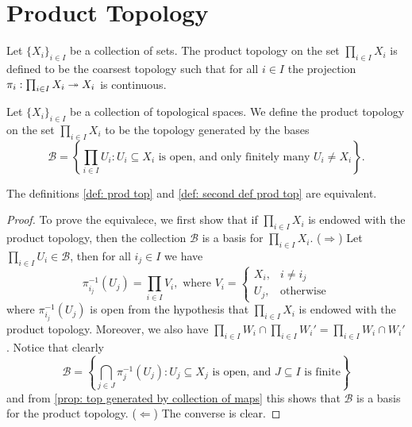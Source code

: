 \section{Product Topology}

\begin{definition}
  \label{def: prod top}
  Let \(\{X_i\}_{i \in I}\) be a collection of sets. The product topology on the
  set \(\prod_{i \in I} X_i\) is defined to be the coarsest topology such that
  for all \(i \in I\) the projection \(\pi_i : \prod_{i \in I} X_i \twoheadrightarrow X_i\) is
  continuous.
\end{definition}

\begin{definition}
  \label{def: second def prod top}
  Let \(\{X_i\}_{i \in I}\) be a collection of topological spaces. We
  define the product topology on the set \(\prod_{i \in I} X_i\) to be the
  topology generated by the bases 
  \[
    \mathcal B = \left\{ \prod_{i \in I} U_i : U_i \subseteq X_i
    \text{ is open, and only finitely many } U_i \neq X_i \right\}.
  \]
\end{definition}

\begin{corollary}\label{cor: equivalent defs prod top}
  The definitions \ref{def: prod top} and \ref{def: second def prod top}
  are equivalent.
\end{corollary}

\begin{proof}
  To prove the equivalece, we first show that if \(\prod_{i \in I} X_i\) is
  endowed with the product topology, then the collection \(\mathcal B\) is a
  basis for \(\prod_{i \in I} X_i\). (\(\Rightarrow\)) Let \(\prod_{i \in I} U_i
  \in \mathcal B\), then for all \(i_j \in I\) we have 
  \[
    \pi_{i_j}^{-1}(U_j) = \prod_{i \in I} V_i, \text{ where } V_i =
    \begin{cases}
      X_i, &i \neq i_j \\
      U_j, &\text{otherwise}
    \end{cases}
  \]
  where \(\pi_{i_j}^{-1}(U_j)\) is open from the hypothesis that \(\prod_{i
  \in I} X_i\) is endowed with the product topology. Moreover, we also have
  \(\prod_{i \in I} W_i \cap \prod_{i \in I} W_i' = \prod_{i \in I} W_i \cap
  W_i'\). Notice that clearly
  \[
    \mathcal B = \left\{ \bigcap_{j \in J} \pi_j^{-1}(U_j) : U_j \subseteq X_j
    \text{ is open, and } J \subseteq I \text{ is finite}\right\} 
  \] 
  and from \cref{prop: top generated by collection of maps} this shows that
  \(\mathcal B\) is a basis for the product topology. (\(\Leftarrow\)) The
  converse is clear.
\end{proof}


